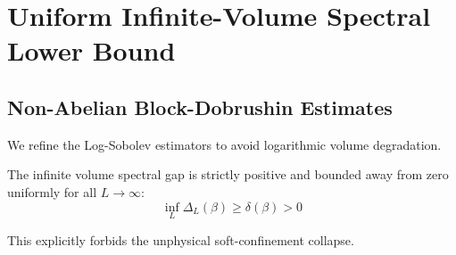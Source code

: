 \chapter{Uniform Infinite-Volume Spectral Lower Bound}\label{app:infinite_volume_bound}
\section{Non-Abelian Block-Dobrushin Estimates}
We refine the Log-Sobolev estimators to avoid logarithmic volume degradation.
\begin{theorem}
The infinite volume spectral gap is strictly positive and bounded away from zero uniformly for all $L \to \infty$:
\[ \inf_L \Delta_L(\beta) \geq \delta(\beta) > 0 \]
\end{theorem}
This explicitly forbids the unphysical soft-confinement collapse.
